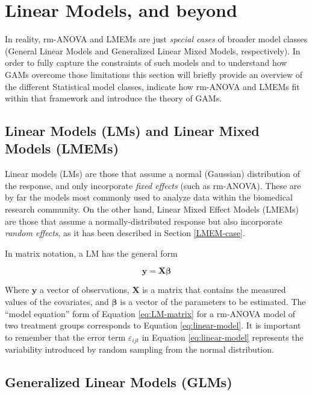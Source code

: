 \documentclass[
]{article}
\begin{document}
\hypertarget{linear-models-and-beyond}{%
\section{Linear Models, and beyond}\label{linear-models-and-beyond}}

In reality, rm-ANOVA and LMEMs are just \emph{special cases} of broader model classes (General Linear Models and Generalized Linear Mixed Models, respectively). In order to fully capture the constraints of such models and to understand how GAMs overcome those limitations this section will briefly provide an overview of the different Statistical model classes, indicate how rm-ANOVA and LMEMs fit within that framework and introduce the theory of GAMs.

\hypertarget{linear-models-lms-and-linear-mixed-models-lmems}{%
\subsection{Linear Models (LMs) and Linear Mixed Models (LMEMs)}\label{linear-models-lms-and-linear-mixed-models-lmems}}

Linear models (LMs) are those that assume a normal (Gaussian) distribution of the response, and only incorporate \emph{fixed effects} (such as rm-ANOVA). These are by far the models most commonly used to analyze data within the biomedical research community. On the other hand, Linear Mixed Effect Models (LMEMs) are those that assume a normally-distributed response but also incorporate \emph{random effects}, as it has been described in Section \ref{LMEM-case}.

In matrix notation, a LM has the general form

\begin{equation}
\textbf{y} = \textbf{X} \boldsymbol{\beta}
\label{eq:LM-matrix}
\end{equation}

Where \(\textbf{y}\) a vector of observations, \(\textbf{X}\) is a matrix that contains the measured values of the covariates, and \(\boldsymbol{\beta}\) is a vector of the parameters to be estimated. The ``model equation'' form of Equation \eqref{eq:LM-matrix} for a rm-ANOVA model of two treatment groups corresponds to Equation \eqref{eq:linear-model}. It is important to remember that the error term \(\varepsilon_{ijt}\) in Equation \eqref{eq:linear-model} represents the variability introduced by random sampling from the normal distribution.

\hypertarget{generalized-linear-models-glms}{%
\subsection{Generalized Linear Models (GLMs)}\label{generalized-linear-models-glms}}
\end{document}
